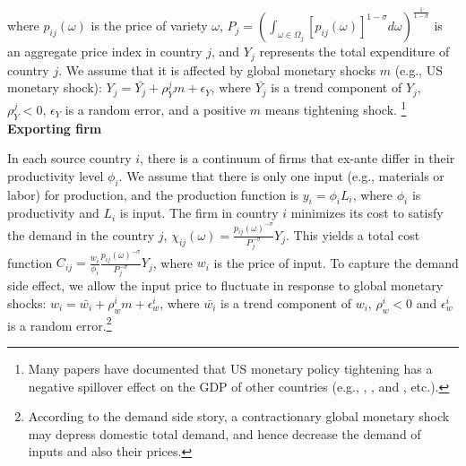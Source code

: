 where $p_{ij}(\omega)$ is the price of variety $\omega$, $P_j=(\int_{\omega \in \Omega_j} [p_{ij}(\omega)]^{1-\sigma} d \omega)^{\frac{1}{1-\sigma}}$ is an aggregate price index in country $j$, and $Y_j$ represents the total expenditure of country $j$. We assume that it is affected by global monetary shocks $m$ (e.g., US monetary shock): $Y_j=\bar{Y_j}+\rho_{Y}^j m+\epsilon_Y$, where $\bar{Y_j}$ is a trend component of $Y_j$, $\rho_{Y}^j<0$, $\epsilon_Y$ is a random error, and a positive $m$ means tightening shock. \footnote{Many papers have documented that US monetary policy tightening has a negative spillover effect on the GDP of other countries (e.g., \cite{kim2001international}, \cite{georgiadis2016determinants}, and \cite{iacoviello2019foreign}, etc.).} \\
 

\textbf{Exporting firm}

In each source country $i$, there is a continuum of firms that ex-ante differ in their productivity level $\phi_i$. We assume that there is only one input (e.g., materials or labor) for production, and the production function is $ y_i= \phi_i L_i$, where $\phi_i$ is productivity and $L_i$ is input. The firm in country $i$ minimizes its cost to satisfy the demand in the country $j$, $\chi_{ij}(\omega)=\frac{p_{ij}(\omega)^{-\sigma}}{P_j^{-\sigma}} Y_j$. This yields a total cost function $ C_{ij}=\frac{w_i}{\phi_i} \frac{p_{ij}(\omega)^{-\sigma}}{P_j^{-\sigma}} Y_j$, where $w_i$ is the price of input. To capture the demand side effect, we allow the input price to fluctuate in response to global monetary shocks: $w_i=\bar{w_i}+\rho_w^i m + \epsilon_w^i$, where $\bar{w_i}$ is a trend component of $w_i$, $\rho_w^i<0$ and $\epsilon_w^i$ is a random error.\footnote{According to the demand side story, a contractionary global monetary shock may depress domestic total demand, and hence decrease the demand of inputs and also their prices.} 

